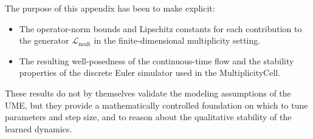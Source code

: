 \documentclass[11pt]{article}
\begin{document}
The purpose of this appendix has been to make explicit:

\begin{itemize}[nosep]
\item The operator-norm bounds and Lipschitz constants for each contribution to the generator \(\mathcal{L}_{\mathrm{mult}}\) in the finite-dimensional multiplicity setting.
\item The resulting well-posedness of the continuous-time flow and the stability properties of the discrete Euler simulator used in the MultiplicityCell.
\end{itemize}

These results do not by themselves validate the modeling assumptions of the UME, but they provide a mathematically controlled foundation on which to tune parameters and step size, and to reason about the qualitative stability of the learned dynamics.

\nocite{*}
  

\end{document}
